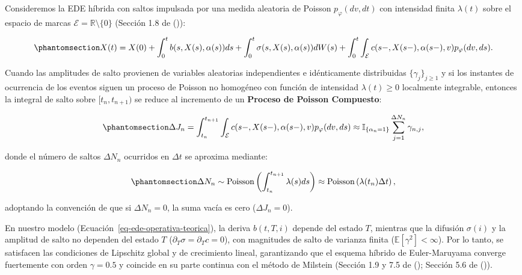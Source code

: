 \documentclass[
  spanish,
  us-letterpaper,
]{scrreprt}
\numberwithin{equation}{section}
\theoremstyle{plain}
\theoremstyle{plain}
\theoremstyle{plain}
\theoremstyle{definition}
\theoremstyle{remark}
\begin{document}
Consideremos la EDE híbrida con saltos impulsada por una medida
aleatoria de Poisson \(p_\varphi(dv, dt)\) con intensidad finita
\(\lambda(t)\) sobre el espacio de marcas
\(\mathcal{E} = \mathbb{R}\setminus\{0\}\) (Sección 1.8 de
()):

\begin{equation}\phantomsection\label{eq-ede-hibrida-saltos-num}{
X(t) = X(0) + \int_0^t b(s, X(s), \alpha(s))ds + \int_0^t \sigma(s, X(s), \alpha(s))dW(s) + \int_0^t \int_{\mathcal{E}} c(s-, X(s-), \alpha(s-), v) p_\varphi(dv, ds).
}\end{equation}

Cuando las amplitudes de salto provienen de variables aleatorias
independientes e idénticamente distribuidas \(\{\gamma_j\}_{j \ge 1}\) y
si los instantes de ocurrencia de los eventos siguen un proceso de
Poisson no homogéneo con función de intensidad \(\lambda(t) \geq 0\)
localmente integrable, entonces la integral de salto sobre
\([t_n, t_{n+1})\) se reduce al incremento de un \textbf{Proceso de
Poisson Compuesto}:

\begin{equation}\phantomsection\label{eq-incremento-poisson-compuesto}{
\Delta J_n = \int_{t_n}^{t_{n+1}} \int_{\mathcal{E}} c(s-, X(s-), \alpha(s-), v) p_\varphi(dv, ds) \approx \mathbb{I}_{\{\alpha_n = 1\}} \sum_{j=1}^{\Delta N_n} \gamma_{n, j},
}\end{equation}

donde el número de saltos \(\Delta N_n\) ocurridos en \(\Delta t\) se
aproxima mediante:

\begin{equation}\phantomsection\label{eq-conteo-poisson-paso}{
\Delta N_n \sim \text{Poisson}\left( \int_{t_n}^{t_{n+1}} \lambda(s)ds \right) \approx \text{Poisson}\left( \lambda(t_n)\Delta t \right),
}\end{equation}

adoptando la convención de que si \(\Delta N_n = 0\), la suma vacía es
cero (\(\Delta J_n = 0\)).

En nuestro modelo (Ecuación~\ref{eq-ede-operativa-teorica}), la deriva
\(b(t, T, i)\) depende del estado \(T\), mientras que la difusión
\(\sigma(i)\) y la amplitud de salto no dependen del estado \(T\)
(\(\partial_T \sigma = \partial_T c = 0\)), con magnitudes de salto de
varianza finita (\(\mathbb{E}[\gamma^2] < \infty\)). Por lo tanto, se
satisfacen las condiciones de Lipschitz global y de crecimiento lineal,
garantizando que el esquema híbrido de Euler-Maruyama converge
fuertemente con orden \(\gamma = 0.5\) y coincide en su parte continua
con el método de Milstein (Sección 1.9 y 7.5 de
();
Sección 5.6 de ()).
\end{document}
